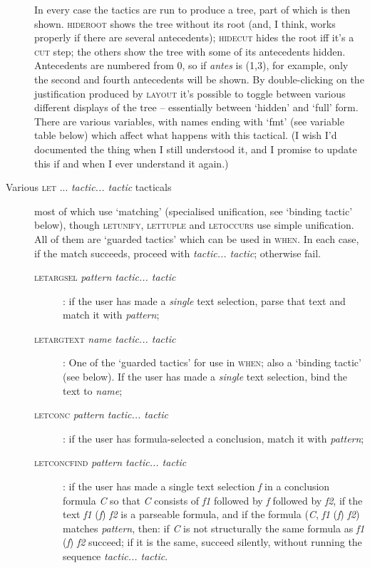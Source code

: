 \begin{description}
In every case the tactics are run to produce a tree, part of which is then shown. \textsc{hideroot} shows the tree without its root (and, I think, works properly if there are several antecedents); \textsc{hidecut} hides the root iff it's a \textsc{cut} step; the others show the tree with some of its antecedents hidden. Antecedents are numbered from 0, so if \textit{antes} is (1,3), for example, only the second and fourth antecedents will be shown. By double-clicking on the justification produced by \textsc{layout} it's possible to toggle between various different displays of the tree -- essentially between `hidden' and `full' form. There are various variables, with names ending with `fmt' (see variable table below) which affect what happens with this tactical. (I wish I'd documented the thing when I still understood it, and I promise to update this if and when I ever understand it again.)

\item [Various \textsc{let} ... \textit{tactic... tactic} tacticals] most of which use `matching' (specialised unification, see `binding tactic' below), though \textsc{letunify}, \textsc{lettuple} and \textsc{letoccurs} use simple unification. All of them are `guarded tactics' which can be used in \textsc{when}. In each case, if the match succeeds, proceed with \textit{tactic... tactic}; otherwise fail. \vspace{-25pt}

\begin{description}
\item[] \item [\textsc{letargsel} \textit{pattern tactic... tactic}]: if the user has made a \textit{single} text selection, parse that text and match it with \textit{pattern}; 

\item [\textsc{letargtext} \textit{name tactic... tactic}]: One of the `guarded tactics' for use in \textsc{when}; also a `binding tactic' (see below). If the user has made a \textit{single} text selection, bind the text to \textit{name}; 

\item [\textsc{letconc} \textit{pattern tactic... tactic}]: if the user has formula-selected a conclusion, match it with \textit{pattern}; 

\item [\textsc{letconcfind} \textit{pattern tactic... tactic}]: if the user has made a single text selection \textit{f} in a conclusion formula \textit{C} so that \textit{C} consists of \textit{f1} followed by \textit{f} followed by \textit{f2}, if the text \textit{f1} (\textit{f}) \textit{f2} is a parseable formula, and if the formula (\textit{C}, \textit{f1} (\textit{f}) \textit{f2}) matches \textit{pattern}, then: if \textit{C} is not structurally the same formula as \textit{f1} (\textit{f}) \textit{f2} succeed; if it is the same, succeed silently, without running the sequence \textit{tactic... tactic}.


\end{description}
\end{description}
